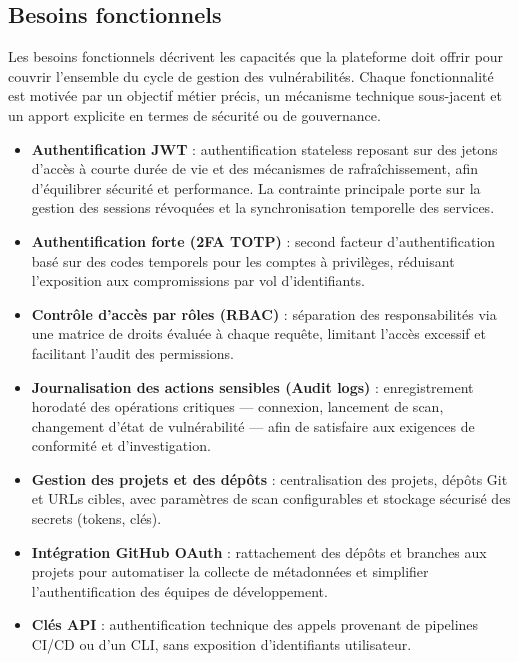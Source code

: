 \subsection{Besoins fonctionnels}

Les besoins fonctionnels décrivent les capacités que la plateforme doit offrir pour
couvrir l'ensemble du cycle de gestion des vulnérabilités. Chaque fonctionnalité est
motivée par un objectif métier précis, un mécanisme technique sous-jacent et un apport
explicite en termes de sécurité ou de gouvernance.

\begin{itemize}
  \item \textbf{Authentification JWT} : authentification stateless reposant sur des
  jetons d'accès à courte durée de vie et des mécanismes de rafraîchissement, afin
  d'équilibrer sécurité et performance. La contrainte principale porte sur la gestion
  des sessions révoquées et la synchronisation temporelle des services.

  \item \textbf{Authentification forte (2FA TOTP)} : second facteur d'authentification
  basé sur des codes temporels pour les comptes à privilèges, réduisant l'exposition
  aux compromissions par vol d'identifiants.

  \item \textbf{Contrôle d'accès par rôles (RBAC)} : séparation des responsabilités
  via une matrice de droits évaluée à chaque requête, limitant l'accès excessif et
  facilitant l'audit des permissions.

  \item \textbf{Journalisation des actions sensibles (Audit logs)} : enregistrement
  horodaté des opérations critiques — connexion, lancement de scan, changement d'état
  de vulnérabilité — afin de satisfaire aux exigences de conformité et d'investigation.

  \item \textbf{Gestion des projets et des dépôts} : centralisation des projets, dépôts
  Git et URLs cibles, avec paramètres de scan configurables et stockage sécurisé des
  secrets (tokens, clés).

  \item \textbf{Intégration GitHub OAuth} : rattachement des dépôts et branches aux
  projets pour automatiser la collecte de métadonnées et simplifier l'authentification
  des équipes de développement.

  \item \textbf{Clés API} : authentification technique des appels provenant de pipelines
  CI/CD ou d'un CLI, sans exposition d'identifiants utilisateur.


\end{itemize}
